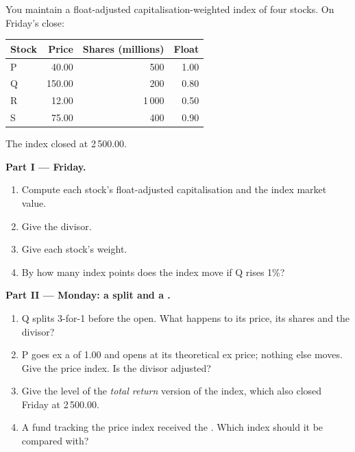 \begin{problem}\label{pb:m1:shares-corporate-actions-indices:1}
You maintain a float-adjusted capitalisation-weighted index of four stocks.
On Friday's close:
\begin{center}\small
\begin{tabular}{@{}lrrr@{}}
\hline
Stock & Price & Shares (millions) & Float \\
\hline
P & 40.00 & 500 & 1.00 \\
Q & 150.00 & 200 & 0.80 \\
R & 12.00 & 1\,000 & 0.50 \\
S & 75.00 & 400 & 0.90 \\
\hline
\end{tabular}
\end{center}
The index closed at 2\,500.00.

\medskip\noindent\textbf{Part I --- Friday.}
\begin{enumerate}
\item Compute each stock's float-adjusted capitalisation and the index
market value.
\item Give the divisor.
\item Give each stock's weight.
\item By how many index points does the index move if Q rises 1\%?
\end{enumerate}

\medskip\noindent\textbf{Part II --- Monday: a split and a .}
\begin{enumerate}[resume]
\item Q splits 3-for-1 before the open. What happens to its price, its
shares and the divisor?
\item P goes ex a  of 1.00 and opens at its theoretical ex price;
nothing else moves. Give the price index. Is the divisor adjusted?
\item Give the level of the \emph{total return} version of the index, which
also closed Friday at 2\,500.00.
\item A fund tracking the price index received the . Which index
should it be compared with?
\end{enumerate}


\end{problem}
